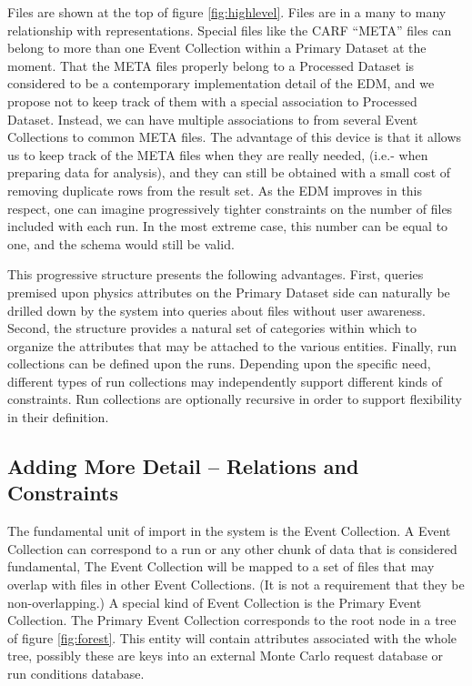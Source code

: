 \documentclass{cmspaper}
\begin{document}
Files are shown at the top of figure \ref{fig:highlevel}. Files are in a many to 
many relationship with representations.  Special files like the CARF ``META'' files
can belong to more than one Event Collection within a Primary Dataset at the moment.
That the META files properly belong to a Processed Dataset is considered to 
be a contemporary  implementation detail of the EDM, and we propose not to keep track 
of them with a special association to Processed Dataset.  Instead, we can have 
multiple associations to from several Event Collections to common META files.  The 
advantage of this 
device is that it allows us to keep track of the META files when they are really needed, 
(i.e.- when preparing data for analysis), and they can still be obtained with a 
small cost of removing duplicate rows from the result set.  As the EDM improves in this 
respect, one can imagine progressively tighter constraints on the number of files included 
with each run.   In the most extreme case, this number can be equal to one, and the schema 
would still be valid.

This progressive structure presents the following advantages.  First, queries 
premised upon physics attributes on the Primary Dataset side 
can naturally be drilled down by the system into queries about files without user awareness.
Second,  the structure provides a natural set of categories within which to organize the 
attributes that may be attached to the various entities.  Finally, run collections can be 
defined upon the runs.  Depending upon the specific need, different types of run collections 
may independently support different kinds of constraints.  Run collections are optionally 
recursive in order to support flexibility in their definition.

\subsection{Adding More Detail -- Relations and Constraints}


The fundamental unit of import in the system is the Event Collection.  A Event Collection 
can correspond to a run or any other chunk of data that is considered fundamental,  
The Event Collection will be mapped to a set of files that may overlap with files in 
other Event Collections.  (It is not a requirement that they be non-overlapping.) A
special kind of Event Collection is the Primary Event Collection.  The Primary Event Collection
corresponds to the root node in a tree of figure \ref{fig:forest}.  This entity
will contain attributes associated with the whole tree, possibly these are keys into 
an external Monte Carlo request database or run conditions database.
\end{document}
